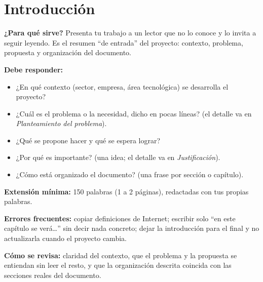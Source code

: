 
\section{Introducción} \label{sec:introduccion} %

\begin{guia}
\textbf{¿Para qué sirve?} Presenta tu trabajo a un lector que no lo conoce y lo invita a seguir leyendo. Es el resumen
``de entrada'' del proyecto: contexto, problema, propuesta y organización del documento.

\textbf{Debe responder:}
\begin{itemize}[nosep,leftmargin=*]
  \item ¿En qué contexto (sector, empresa, área tecnológica) se desarrolla el proyecto?
  \item ¿Cuál es el problema o la necesidad, dicho en pocas líneas? (el detalle va en \emph{Planteamiento del problema}).
  \item ¿Qué se propone hacer y qué se espera lograr?
  \item ¿Por qué es importante? (una idea; el detalle va en \emph{Justificación}).
  \item ¿Cómo está organizado el documento? (una frase por sección o capítulo).
\end{itemize}

\textbf{Extensión mínima:} 150 palabras (1 a 2 páginas), redactadas con tus propias palabras.

\textbf{Errores frecuentes:} copiar definiciones de Internet; escribir solo ``en este capítulo se verá\ldots'' sin decir
nada concreto; dejar la introducción para el final y no actualizarla cuando el proyecto cambia.

\textbf{Cómo se revisa:} claridad del contexto, que el problema y la propuesta se entiendan sin leer el resto, y que la
organización descrita coincida con las secciones reales del documento.
\end{guia}

